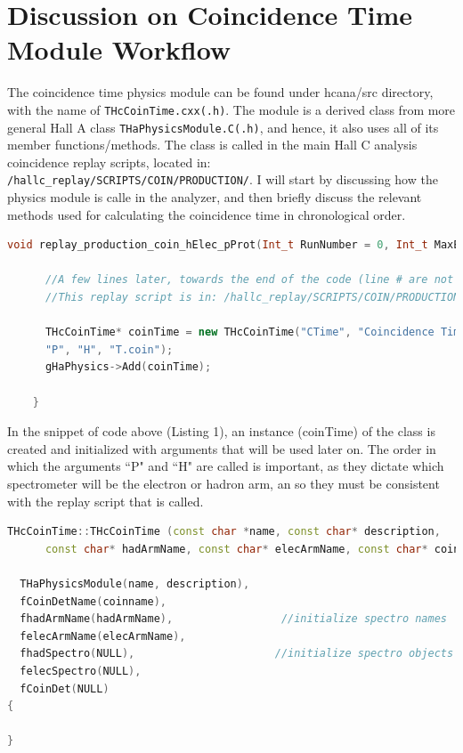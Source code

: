 \documentclass[14pt]{article}
\begin{document}
  \newpage

  \section{Discussion on Coincidence Time Module Workflow}
  \noindent The coincidence time physics module can be found under hcana/src directory, with the name of \texttt{THcCoinTime.cxx(.h)}. The module
  is a derived class from more general Hall A class \texttt{THaPhysicsModule.C(.h)}, and hence, it also uses all of its member functions/methods. The
  class is called in the main Hall C analysis coincidence replay scripts, located in: \\
  \texttt{/hallc\_replay/SCRIPTS/COIN/PRODUCTION/}. I will start by discussing how the physics module is calle in the analyzer, and then
  briefly discuss the relevant methods used for calculating the coincidence time in chronological order.
  
  \begin{lstlisting}[language=C++, caption={Adding the Module in the Analyzer}] 
    void replay_production_coin_hElec_pProt(Int_t RunNumber = 0, Int_t MaxEvent = 0) {
     
      //A few lines later, towards the end of the code (line # are not same) 
      //This replay script is in: /hallc_replay/SCRIPTS/COIN/PRODUCTION/
      
      THcCoinTime* coinTime = new THcCoinTime("CTime", "Coincidence Time Determination",
      "P", "H", "T.coin"); 
      gHaPhysics->Add(coinTime);

    }
  \end{lstlisting}
  In the snippet of code above (Listing 1), an instance (coinTime) of the class is created and initialized with arguments that will be used
  later on. The order in which the arguments ``P" and ``H" are called is important, as they dictate which spectrometer will be the electron or hadron arm,
  an so they must be consistent with the replay script that is called. \\
  \newline
    \begin{lstlisting}[language=C++, caption={THcCoinTime.cxx, The Constructor Method}] 
      THcCoinTime::THcCoinTime (const char *name, const char* description,
      const char* hadArmName, const char* elecArmName, const char* coinname) :
  
  THaPhysicsModule(name, description), 
  fCoinDetName(coinname), 
  fhadArmName(hadArmName),                 //initialize spectro names
  felecArmName(elecArmName),
  fhadSpectro(NULL),                      //initialize spectro objects
  felecSpectro(NULL),
  fCoinDet(NULL)
{

}

  \end{lstlisting}
\end{document}
